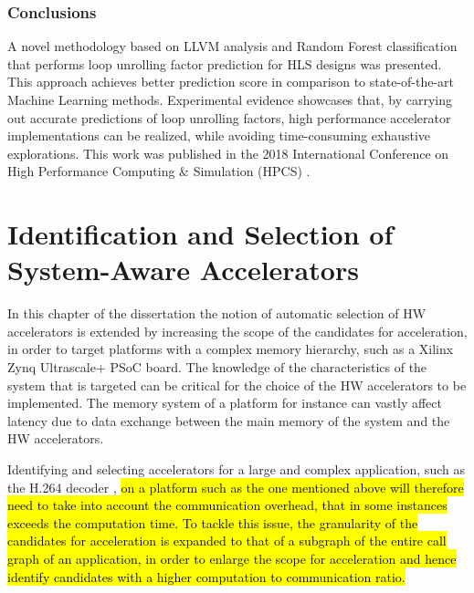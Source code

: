 \documentclass[]{usiinfthesis}
\begin{document}
\subsection{Conclusions}

A novel methodology based on LLVM analysis and Random Forest classification that performs loop unrolling 
factor prediction for HLS designs was presented. This approach achieves better prediction score 
in comparison to state-of-the-art Machine Learning methods. Experimental evidence showcases that, 
by carrying out accurate predictions of loop unrolling factors, high performance accelerator 
implementations can be realized, while avoiding time-consuming exhaustive explorations. This work was 
published in the 2018 International Conference on High Performance Computing \& Simulation (HPCS) 
\cite{ZacharopoulosJul18}.


%
%
%
%
%  
%
%
%
%
%


\chapter[Identification and Selection of System-Aware Accelerators]
{Identification and Selection of \\ System-Aware Accelerators}

In this chapter of the dissertation the notion of automatic selection of HW accelerators is extended
by increasing the scope of the candidates for acceleration, in order to target platforms 
with a complex memory hierarchy, such as a Xilinx Zynq Ultrascale+ PSoC board.
The knowledge of the characteristics of the system that is targeted can be critical for the choice of the HW accelerators
to be implemented. The memory system of a platform for instance can vastly affect latency due to data
exchange between the main memory of the system and the HW accelerators.\par

Identifying and selecting accelerators for a 
large and complex application, such as the H.264 decoder \cite{LiuFeb16}, 
\hl{
on a platform such as the one mentioned 
above will therefore need to 
take into account the communication overhead, that in some instances exceeds the computation
time. To tackle this issue,
the granularity of the candidates for acceleration is 
expanded to that of a subgraph of the entire call graph of an application, in order to enlarge 
the scope for acceleration and hence identify candidates with a higher computation to communication
ratio.
}
\par
\end{document}
